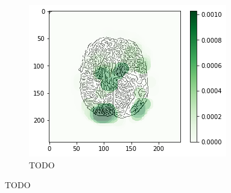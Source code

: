 \begin{figure}[H]
\begin{subfigure}{.33\textwidth}
        \includegraphics[width=\linewidth]{chapters/06_hdm/circle20/19.png}
        \caption{TODO}
    \end{subfigure}
    \caption{TODO}
\end{figure}